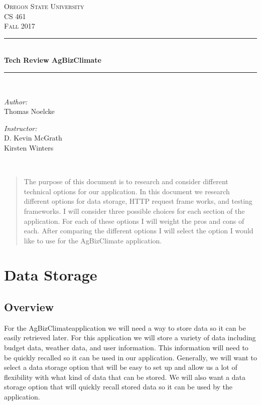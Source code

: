\documentclass[letterpaper,10pt]{article}
\begin{document}
    \begin{titlepage}
    \newcommand{\HRule}{\rule{\linewidth}{0.5mm}}
    \center
    \textsc{\Large Oregon State University}\\[1.5cm]
    \textsc{\Large CS 461}\\[0.5cm]
    \textsc{\Large Fall 2017}\\[0.5cm]
    \HRule \\[0.4cm]
    { \huge \bfseries Tech Review AgBizClimate}\\[0.4cm] %
    \HRule \\[1.5cm]
    \begin{minipage}{0.4\textwidth}
        \begin{flushleft} \large
        \emph{Author:}\\
        Thomas Noelcke
        \end{flushleft}
    \end{minipage}
    \begin{minipage}{0.4\textwidth}
        \begin{flushright} \large
        \emph{Instructor:} \\
        D. Kevin McGrath\\
        Kirsten Winters
        \end{flushright}
    \end{minipage}\\[2cm]
    \begin{abstract}
    \item 
		The purpose of this document is to research and consider different technical options for our application. In this document we research different options for data storage, HTTP request frame works, and testing frameworks. I will consider three possible choices for each section of the application. For each of these options I will weight the pros and cons of each. After comparing the different options I will select the option I would like to use for the AgBizClimate application.
    \end{abstract}
    \vfill %
    \end{titlepage}
		
\section{Data Storage}
	\subsection{Overview}
		For the AgBizClimate\textcopyright application we will need a way to store data so it can be easily retrieved later. For this application we will store a variety of data including budget data, weather data, and user information. This information will need to be quickly recalled so it can be used in our application. Generally, we will want to select a data storage option that will be easy to set up and allow us a lot of flexibility with what kind of data that can be stored. We will also want a data storage option that will quickly recall stored data so it can be used by the application.\\
\end{document}
